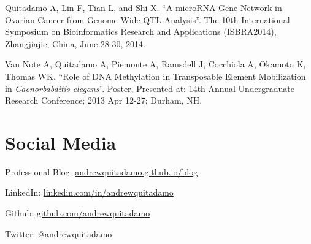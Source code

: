 \documentclass[margin,line]{res}
\begin{document}
\begin{resume}
Quitadamo A, Lin F, Tian L, and Shi X. ``A microRNA-Gene Network in Ovarian Cancer from Genome-Wide QTL Analysis''. The 10th International Symposium on Bioinformatics Research and Applications (ISBRA2014), Zhangjiajie, China, June 28-30, 2014.

Van Note A, Quitadamo A, Piemonte A, Ramsdell J, Cocchiola A, Okamoto K, Thomas WK. ``Role of DNA Methylation in Transposable Element Mobilization in {\em Caenorbabditis elegans}''. Poster, Presented at: 14th Annual Undergraduate Research Conference; 2013 Apr 12-27; Durham, NH.

\section{\sc Social Media}

Professional Blog: \href{https://andrewquitadamo.github.io/blog}{andrewquitadamo.github.io/blog}

LinkedIn: \href{http://linkedin.com/in/andrewquitadamo}{linkedin.com/in/andrewquitadamo}

Github: \href{https://github.com/andrewquitadamo}{github.com/andrewquitadamo}

Twitter: \href{https://twitter.com/andrewquitadamo}{@andrewquitadamo}

\end{resume}
\end{document}
